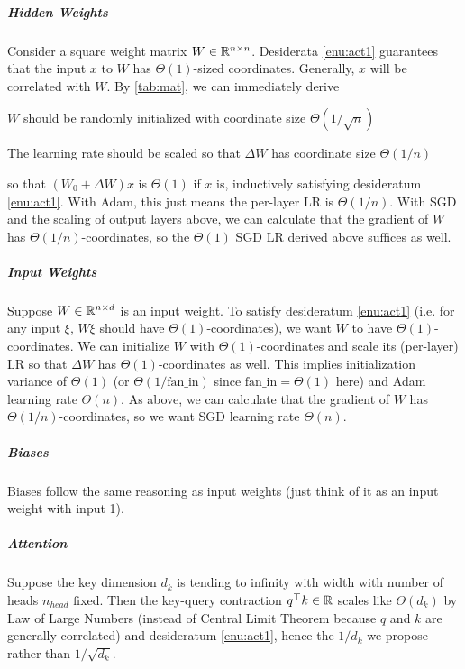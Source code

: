 \documentclass{article}
\theoremstyle{definition}
\newcommand{\fanin}{\mathrm{fan\_in}}
\begin{document}
    \subparagraph*{Hidden Weights}
    
    Consider a square weight matrix $W\in\mathbb{R}^{n\times n}$. Desiderata \ref{enu:act1} guarantees that the input $x$ to $W$ has $\Theta(1)$-sized coordinates. Generally, $x$ will be correlated with $W$. By \cref{tab:mat}, we can immediately derive
    \begin{description}[font=\it]
    \item [{Initialization}] $W$ should be randomly initialized with coordinate size $\Theta(1/\sqrt{n})$
    \item [{LR}] The learning rate should be scaled so that $\Delta W$ has coordinate size $\Theta(1/n)$
    \end{description}
    so that $(W_{0}+\Delta W)x$ is $\Theta(1)$ if $x$ is, inductively satisfying desideratum \ref{enu:act1}. With Adam, this just means the per-layer LR is $\Theta(1/n)$. With SGD and the scaling of output layers above, we can calculate that the gradient of $W$ has $\Theta(1/n)$-coordinates, so the $\Theta(1)$ SGD LR derived above suffices as well.
    
    \subparagraph*{Input Weights}
    
    Suppose $W\in\mathbb{R}^{n\times d}$ is an input weight. To satisfy desideratum \ref{enu:act1} (i.e. for any input $\xi$, $W\xi$ should have $\Theta(1)$-coordinates), we want $W$ to have $\Theta(1)$-coordinates. We can initialize $W$ with $\Theta(1)$-coordinates and scale its (per-layer) LR so that $\Delta W$ has $\Theta(1)$-coordinates as well.
    This implies initialization variance of $\Theta(1)$ (or $\Theta(1/\fanin)$ since $\fanin = \Theta(1)$ here) and Adam learning rate $\Theta(n)$.
    As above, we can calculate that the gradient of $W$ has $\Theta(1/n)$-coordinates, so we want SGD learning rate $\Theta(n)$.
    
    \subparagraph*{Biases}
    
    Biases follow the same reasoning as input weights (just think of it as an input weight with input 1).
    
    \subparagraph*{Attention}
    
    Suppose the key dimension $d_{k}$ is tending to infinity with width with number of heads $n_{head}$ fixed. Then the key-query contraction $q^{\top}k\in\mathbb{R}$ scales like $\Theta(d_{k})$ by Law of Large Numbers (instead of Central Limit Theorem because $q$ and $k$ are generally correlated) and desideratum \ref{enu:act1}, hence the $1/d_{k}$ we propose rather than $1/\sqrt{d_{k}}$.
    
\end{document}
